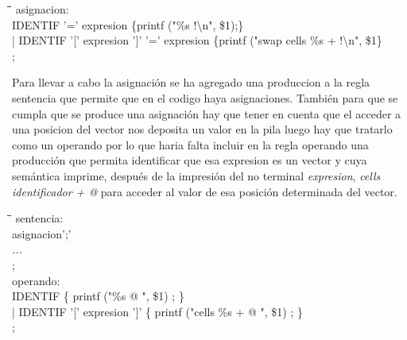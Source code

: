 \documentclass[11pt,spanish]{article}
\begin{document}
		\begin{tcolorbox}
		\begin{tabbing}
			\hspace*{1cm}\=\hspace*{1cm}\= \hspace*{8cm}\=\kill
			asignacion:\\
				\>IDENTIF '=' expresion\> \>											\{printf ("\%s !\textbackslash n", \$1);\}\\
				\>| IDENTIF '[' expresion ']' '=' expresion\> \>						\{printf ("swap cells \%s + !\textbackslash n", \$1\}\\
	
			;
		\end{tabbing}
		\end{tcolorbox}
		Para llevar a cabo la asignación se ha agregado una produccion a la regla {\ttfamily sentencia} que permite que en el codigo haya asignaciones. También para que se cumpla que se produce una asignación hay que tener en cuenta que el acceder a una posicion del vector nos deposita un valor en la pila luego hay que tratarlo como un operando por lo que haria falta incluir en la regla {\ttfamily operando} una producción que permita identificar que esa expresion es un vector y cuya semántica imprime, después de la impresión del no terminal \textit{expresion}, \textit{cells identificador + @} para acceder al valor de esa posición determinada del vector.
		
		\begin{tcolorbox}
		\begin{tabbing}
			\hspace*{1cm}\=\hspace*{1cm}\= \hspace*{4cm}\=\kill
			sentencia:\\
				\>asignacion';'\\
				\>\textit{...}\\
			;\\
			operando:\\	  
				\>IDENTIF\> \>	  		\{ printf ("\%s @ ", \$1) ; \}\\
				\>| IDENTIF '[' expresion ']'\> \> \{ printf ("cells \%s + @ ", \$1) ; \}\\
			;
		\end{tabbing}
		\end{tcolorbox}
\end{document}
